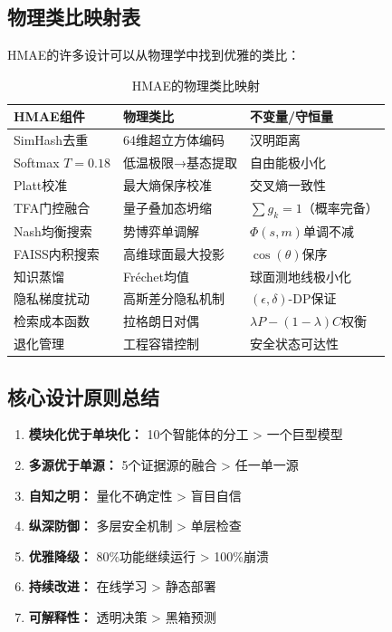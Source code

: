 \documentclass[11pt,a4paper]{ctexart}
\begin{document}
\subsection{物理类比映射表}

HMAE的许多设计可以从物理学中找到优雅的类比：

\begin{table}[H]
\centering
\small
\begin{tabular}{lll}
\toprule
\textbf{HMAE组件} & \textbf{物理类比} & \textbf{不变量/守恒量} \\
\midrule
SimHash去重 & 64维超立方体编码 & 汉明距离 \\
Softmax $T=0.18$ & 低温极限→基态提取 & 自由能极小化 \\
Platt校准 & 最大熵保序校准 & 交叉熵一致性 \\
TFA门控融合 & 量子叠加态坍缩 & $\sum g_k = 1$（概率完备） \\
Nash均衡搜索 & 势博弈单调解 & $\Phi(s,m)$单调不减 \\
FAISS内积搜索 & 高维球面最大投影 & $\cos(\theta)$保序 \\
知识蒸馏 & Fréchet均值 & 球面测地线极小化 \\
隐私梯度扰动 & 高斯差分隐私机制 & $(\epsilon,\delta)$-DP保证 \\
检索成本函数 & 拉格朗日对偶 & $\lambda P - (1-\lambda)C$权衡 \\
退化管理 & 工程容错控制 & 安全状态可达性 \\
\bottomrule
\end{tabular}
\caption{HMAE的物理类比映射}
\end{table}

\subsection{核心设计原则总结}

\begin{enumerate}[nosep]
\item \textbf{模块化优于单块化：} 10个智能体的分工 > 一个巨型模型
\item \textbf{多源优于单源：} 5个证据源的融合 > 任一单一源
\item \textbf{自知之明：} 量化不确定性 > 盲目自信
\item \textbf{纵深防御：} 多层安全机制 > 单层检查
\item \textbf{优雅降级：} 80\%功能继续运行 > 100\%崩溃
\item \textbf{持续改进：} 在线学习 > 静态部署
\item \textbf{可解释性：} 透明决策 > 黑箱预测
\end{enumerate}
\end{document}
